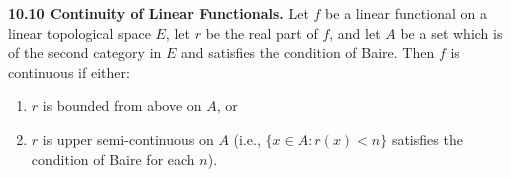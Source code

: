 \textbf{10.10 Continuity of Linear Functionals.} Let $f$ be a linear functional on a linear topological space $E$, let $r$ be the real part of $f$, and let $A$ be a set which is of the second category in $E$ and satisfies the condition of Baire. Then $f$ is continuous if either:

\begin{enumerate}
\item $r$ is bounded from above on $A$, or
\item $r$ is upper semi-continuous on $A$ (i.e., $\{x \in A : r(x) < n\}$ satisfies the condition of Baire for each $n$).
\end{enumerate}
